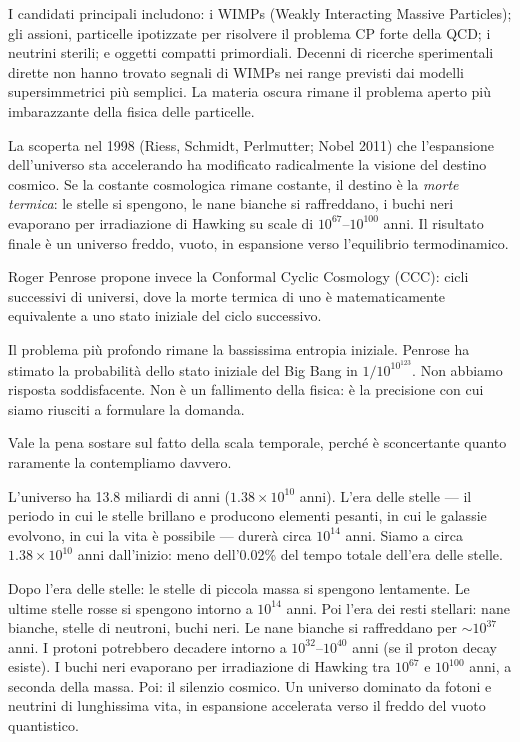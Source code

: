 \documentclass[12pt,a4paper,openany]{book}
\newcommand{\sezione}[1]{\vspace{1.2em}{\large\bfseries #1}\vspace{0.5em}\par}
\begin{document}
I candidati principali includono: i WIMPs (Weakly Interacting Massive Particles); gli assioni, particelle ipotizzate per risolvere il problema CP forte della QCD; i neutrini sterili; e oggetti compatti primordiali. Decenni di ricerche sperimentali dirette non hanno trovato segnali di WIMPs nei range previsti dai modelli supersimmetrici più semplici. La materia oscura rimane il problema aperto più imbarazzante della fisica delle particelle.

\sezione{Il destino: morte termica, Big Rip, e la cosmologia ciclica di Penrose}

La scoperta nel 1998 (Riess, Schmidt, Perlmutter; Nobel 2011) che l'espansione dell'universo sta accelerando ha modificato radicalmente la visione del destino cosmico. Se la costante cosmologica rimane costante, il destino è la \textit{morte termica}: le stelle si spengono, le nane bianche si raffreddano, i buchi neri evaporano per irradiazione di Hawking su scale di $10^{67}$--$10^{100}$ anni. Il risultato finale è un universo freddo, vuoto, in espansione verso l'equilibrio termodinamico.

Roger Penrose propone invece la Conformal Cyclic Cosmology (CCC): cicli successivi di universi, dove la morte termica di uno è matematicamente equivalente a uno stato iniziale del ciclo successivo.

Il problema più profondo rimane la bassissima entropia iniziale. Penrose ha stimato la probabilità dello stato iniziale del Big Bang in $1/10^{10^{123}}$. Non abbiamo risposta soddisfacente. Non è un fallimento della fisica: è la precisione con cui siamo riusciti a formulare la domanda.

\sezione{La scala del tempo cosmico}

Vale la pena sostare sul fatto della scala temporale, perché è sconcertante quanto raramente la contempliamo davvero.

L'universo ha 13.8 miliardi di anni ($1.38 \times 10^{10}$ anni). L'era delle stelle --- il periodo in cui le stelle brillano e producono elementi pesanti, in cui le galassie evolvono, in cui la vita è possibile --- durerà circa $10^{14}$ anni. Siamo a circa $1.38 \times 10^{10}$ anni dall'inizio: meno dell'0.02\% del tempo totale dell'era delle stelle.

Dopo l'era delle stelle: le stelle di piccola massa si spengono lentamente. Le ultime stelle rosse si spengono intorno a $10^{14}$ anni. Poi l'era dei resti stellari: nane bianche, stelle di neutroni, buchi neri. Le nane bianche si raffreddano per $\sim 10^{37}$ anni. I protoni potrebbero decadere intorno a $10^{32}$--$10^{40}$ anni (se il proton decay esiste). I buchi neri evaporano per irradiazione di Hawking tra $10^{67}$ e $10^{100}$ anni, a seconda della massa. Poi: il silenzio cosmico. Un universo dominato da fotoni e neutrini di lunghissima vita, in espansione accelerata verso il freddo del vuoto quantistico.
\end{document}

